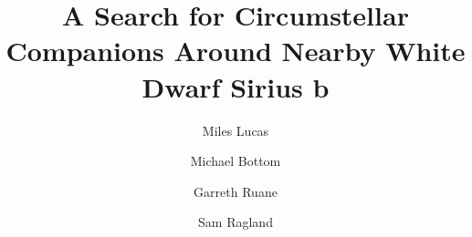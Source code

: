 \documentclass[RNAAS]{aastex631}
\begin{document}
\title{A Search for Circumstellar Companions Around Nearby White Dwarf Sirius b}


\author[0000-0001-6341-310X]{Miles Lucas}

\author[0000-0003-1341-5531]{Michael Bottom}

\author{Garreth Ruane}
\author{Sam Ragland}


\begin{abstract}

\end{abstract}

\section{}




{}

\end{document}
